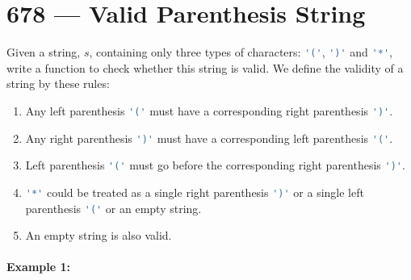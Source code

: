 \section{678 --- Valid Parenthesis String}
Given a string, $s$, containing only three types of characters: \lstinline[language=Java, basicstyle=\small\ttfamily, keywordstyle=\bfseries\color{green!40!black}]|'('|, \lstinline[language=Java, basicstyle=\small\ttfamily, keywordstyle=\bfseries\color{green!40!black}]|')'| and \lstinline[language=Java, basicstyle=\small\ttfamily, keywordstyle=\bfseries\color{green!40!black}]|'*'|, write a function to check whether this string is valid. We define the validity of a string by these rules:

\begin{enumerate}
\item Any left parenthesis \lstinline[language=Java, basicstyle=\small\ttfamily, keywordstyle=\bfseries\color{green!40!black}]|'('| must have a corresponding right parenthesis \lstinline[language=Java, basicstyle=\small\ttfamily, keywordstyle=\bfseries\color{green!40!black}]|')'|.
\item Any right parenthesis \lstinline[language=Java, basicstyle=\small\ttfamily, keywordstyle=\bfseries\color{green!40!black}]|')'| must have a corresponding left parenthesis \lstinline[language=Java, basicstyle=\small\ttfamily, keywordstyle=\bfseries\color{green!40!black}]|'('|.
\item Left parenthesis \lstinline[language=Java, basicstyle=\small\ttfamily, keywordstyle=\bfseries\color{green!40!black}]|'('| must go before the corresponding right parenthesis \lstinline[language=Java, basicstyle=\small\ttfamily, keywordstyle=\bfseries\color{green!40!black}]|')'|.
\item \lstinline[language=Java, basicstyle=\small\ttfamily, keywordstyle=\bfseries\color{green!40!black}]|'*'| could be treated as a single right parenthesis \lstinline[language=Java, basicstyle=\small\ttfamily, keywordstyle=\bfseries\color{green!40!black}]|')'| or a single left parenthesis \lstinline[language=Java, basicstyle=\small\ttfamily, keywordstyle=\bfseries\color{green!40!black}]|'('| or an empty string.
\item An empty string is also valid.
\end{enumerate}

\paragraph{Example 1:}

